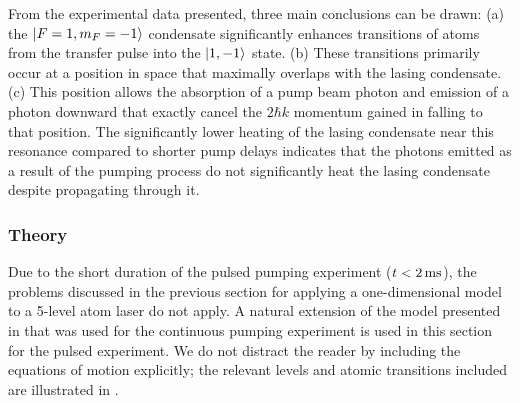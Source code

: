From the experimental data presented, three main conclusions can be drawn: (a) the ${\left|F=1, m_F=-1\right>}$ condensate significantly enhances transitions of atoms from the transfer pulse into the ${\left|1, -1\right>}$ state. (b) These transitions primarily occur at a position in space that maximally overlaps with the lasing condensate. (c) This position allows the absorption of a pump beam photon and emission of a photon downward that exactly cancel the $2 \hbar k$ momentum gained in falling to that position.  The significantly lower heating of the lasing condensate near this resonance compared to shorter pump delays indicates that the photons emitted as a result of the pumping process do not significantly heat the lasing condensate despite propagating through it.

\subsubsection{Theory}


Due to the short duration of the pulsed pumping experiment ($t < \unit[2]{ms}$), the problems discussed in the previous section for applying a one-dimensional model to a 5-level atom laser do not apply.  A natural extension of the model presented in  that was used for the continuous pumping experiment is used in this section for the pulsed experiment.  We do not distract the reader by including the equations of motion explicitly; the relevant levels and atomic transitions included are illustrated in .

